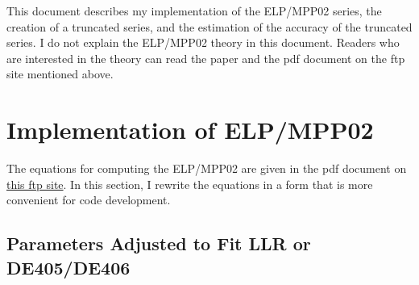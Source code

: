 \documentclass[12pt]{article}
\begin{document}
This document describes my implementation of the ELP/MPP02 series, 
the creation of a truncated series, and the estimation of the accuracy 
of the truncated series. I do not explain the ELP/MPP02 theory in this 
document. Readers who are interested in the theory can read the paper and 
the pdf document on the ftp site mentioned above.

\section{Implementation of ELP/MPP02} 

The equations for computing the ELP/MPP02 are given in the pdf document 
on \href{ftp://cyrano-se.obspm.fr/pub/2_lunar_solutions/2_elpmpp02/}{this ftp site}. 
In this section, I rewrite the equations in a form that is more convenient 
for code development.

\subsection{Parameters Adjusted to Fit LLR or DE405/DE406}
\end{document}
